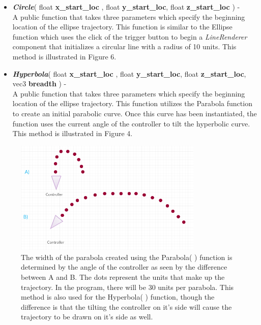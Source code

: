 \documentclass[draftclsnofoot,onecolumn,compsoc]{IEEEtran}
\begin{document}
\begin{itemize}

\item \textbf{\textit{Circle}}( float \textbf{x\_start\_loc} , float \textbf{y\_start\_loc}, float \textbf{z\_start\_loc} ) -\\
A public function that takes three parameters which specify the beginning location of the ellipse trajectory. This function is similar to the Ellipse function which uses the click of the trigger button to begin a \textit{LineRenderer} component that initializes a circular line with a radius of 10 units. This method is illustrated in Figure 6. \\


\newpage

\item \textbf{\textit{Hyperbola}}( float \textbf{x\_start\_loc} , float \textbf{y\_start\_loc}, float \textbf{z\_start\_loc}, vec3 \textbf{breadth} ) -\\
A public function that takes three parameters which specify the beginning location of the ellipse trajectory. This function utilizes the Parabola function to create an initial parabolic curve. Once this curve has been instantiated, the function uses the current angle of the controller to tilt the hyperbolic curve. This method is illustrated in Figure 4. \\
\end{itemize}


\begin{figure}[H]
  \centering
    \includegraphics[width=0.8\textwidth]{parabola}
    \caption{The width of the parabola created using the Parabola( ) function is determined by the angle of the controller as seen by the difference between A and B. The dots represent the units that make up the trajectory. In the program, there will be 30 units per parabola. This method is also used for the Hyperbola( ) function, though the difference is that the tilting the controller on it's side will cause the trajectory to be drawn on it's side as well. }
\end{figure}
\end{document}
